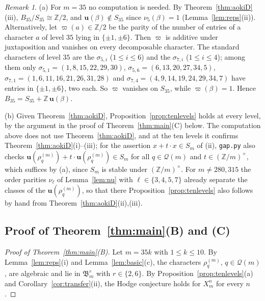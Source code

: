 \documentclass[11pt]{amsart}
\theoremstyle{definition}
\theoremstyle{remark}
\newtheorem{remark}[theorem]{Remark}
\numberwithin{equation}{section}
\newcommand{\Z}{\mathbb{Z}}
\newcommand{\fB}{\mathfrak{B}}
\newcommand{\cQ}{\mathcal{Q}}
\newcommand{\uu}{\mathbf{u}}
\begin{document}
\begin{remark}\label{rem:byhand}
(a) For $m=35$ no computation is needed. By Theorem~\ref{thm:aokiD}(iii), $B_{35}/S_{35}\cong\Z/2$, and $\uu(\beta)\notin S_{35}$ since $\nu_5(\beta)=1$ (Lemma~\ref{lem:reps}(ii)). Alternatively, let $\varpi(a)\in\Z/2$ be the parity of the number of entries of a character $a$ of level $35$ lying in $\{\pm1,\pm6\}$. Then $\varpi$ is additive under juxtaposition and vanishes on every decomposable character. The standard characters of level $35$ are the $\sigma_{5,i}$ ($1\le i\le6$) and the $\sigma_{7,i}$ ($1\le i\le4$); among them only $\sigma_{5,1}=(1,8,15,22,29,30)$, $\sigma_{5,6}=(6,13,20,27,34,5)$, $\sigma_{7,1}=(1,6,11,16,21,26,31,28)$ and $\sigma_{7,4}=(4,9,14,19,24,29,34,7)$ have entries in $\{\pm1,\pm6\}$, two each. So $\varpi$ vanishes on $S_{35}$, while $\varpi(\beta)=1$. Hence $B_{35}=S_{35}+\Z\,\uu(\beta)$.

(b) Given Theorem~\ref{thm:aokiD}, Proposition~\ref{prop:tenlevels} holds at every level, by the argument in the proof of Theorem~\ref{thm:main}(C) below. The computation above does not use Theorem~\ref{thm:aokiD}, and at the ten levels it confirms Theorem~\ref{thm:aokiD}(i)--(iii); for the assertion $x+t\cdot x\in S_m$ of (ii), \texttt{gap.py} also checks $\uu(\rho^{(m)}_q)+t\cdot\uu(\rho^{(m)}_q)\in S_m$ for all $q\in\cQ(m)$ and $t\in(\Z/m)^\times$, which suffices by (a), since $S_m$ is stable under $(\Z/m)^\times$. For $m\ne280,315$ the order parities $\nu_\ell$ of Lemma~\ref{lem:nu} with $\ell\in\{3,4,5,7\}$ already separate the classes of the $\uu(\rho^{(m)}_q)$, so that there Proposition~\ref{prop:tenlevels} also follows by hand from Theorem~\ref{thm:aokiD}(ii),(iii).
\end{remark}

\subsection{Proof of Theorem~\ref{thm:main}(B) and (C)}\label{subsec:proofBC}

\begin{proof}[Proof of Theorem~\ref{thm:main}(B)]
Let $m=35k$ with $1\le k\le10$. By Lemma~\ref{lem:reps}(i) and Lemma~\ref{lem:basic}(c), the characters $\rho^{(m)}_q$, $q\in\cQ(m)$, are algebraic and lie in $\fB^r_m$ with $r\in\{2,6\}$. By Proposition~\ref{prop:tenlevels}(a) and Corollary~\ref{cor:transfer}(ii), the Hodge conjecture holds for $X^n_m$ for every $n$.
\end{proof}
\end{document}
